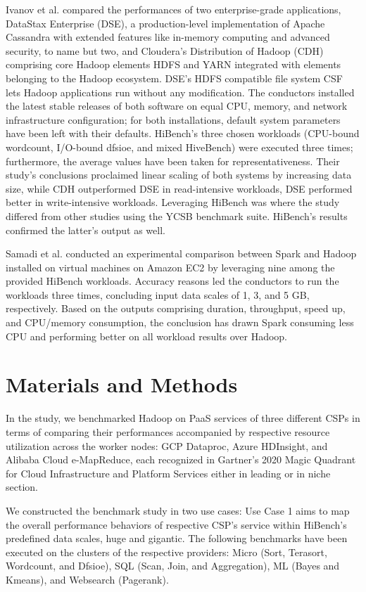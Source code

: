 \documentclass[review]{elsarticle}
\begin{document}
Ivanov et al. \cite{ivanov_performance_2015} compared the performances of two enterprise-grade applications, DataStax Enterprise (DSE), a production-level implementation of Apache Cassandra with extended features like in-memory computing and advanced security, to name but two, and Cloudera's Distribution of Hadoop (CDH) comprising core Hadoop elements HDFS and YARN integrated with elements belonging to the Hadoop ecosystem. DSE's HDFS compatible file system CSF lets Hadoop applications run without any modification. The conductors installed the latest stable releases of both software on equal CPU, memory, and network infrastructure configuration; for both installations, default system parameters have been left with their defaults. HiBench's three chosen workloads (CPU-bound wordcount, I/O-bound dfsioe, and mixed HiveBench) were executed three times; furthermore, the average values have been taken for representativeness. Their study's conclusions proclaimed linear scaling of both systems by increasing data size, while CDH outperformed DSE in read-intensive workloads, DSE performed better in write-intensive workloads. Leveraging HiBench was where the study differed from other studies using the YCSB benchmark suite. HiBench's results confirmed the latter's output as well.

Samadi et al. \cite{samadi_performance_2018} conducted an experimental comparison between Spark and Hadoop installed on virtual machines on Amazon EC2 by leveraging nine among the provided HiBench workloads. Accuracy reasons led the conductors to run the workloads three times, concluding input data scales of 1, 3, and 5 GB, respectively. Based on the outputs comprising duration, throughput, speed up, and CPU/memory consumption, the conclusion has drawn Spark consuming less CPU and performing better on all workload results over Hadoop. 

\section{Materials and Methods}
In the study, we benchmarked Hadoop on PaaS services of three different CSPs in terms of comparing their performances accompanied by respective resource utilization across the worker nodes: GCP Dataproc, Azure HDInsight, and Alibaba Cloud e-MapReduce, each recognized in Gartner's 2020 Magic Quadrant for Cloud Infrastructure and Platform Services \cite{noauthor_gartner_nodate} either in leading or in niche section.

We constructed the benchmark study in two use cases: Use Case 1 aims to map the overall performance behaviors of respective CSP's service within HiBench's predefined data scales, huge and gigantic. The following benchmarks have been executed on the clusters of the respective providers: Micro (Sort, Terasort, Wordcount, and Dfsioe), SQL (Scan, Join, and Aggregation), ML (Bayes and Kmeans), and Websearch (Pagerank).
\end{document}
